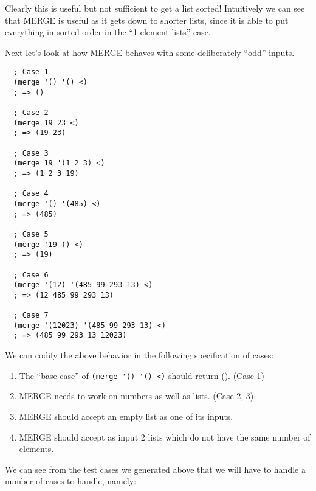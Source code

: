 \documentclass[12pt,openright,draft]{book}
\begin{document}
Clearly this is useful but not sufficient to get a list sorted!
Intuitively we can see that MERGE is useful as it gets down to shorter
lists, since it is able to put everything in sorted order in the
``1-element lists'' case.

Next let's look at how MERGE behaves with some deliberately ``odd''
inputs.

\begin{verbatim}
  ; Case 1
  (merge '() '() <)
  ; => ()

  ; Case 2
  (merge 19 23 <)
  ; => (19 23)

  ; Case 3
  (merge 19 '(1 2 3) <)
  ; => (1 2 3 19)

  ; Case 4
  (merge '() '(485) <)
  ; => (485)

  ; Case 5
  (merge '19 () <)
  ; => (19)

  ; Case 6
  (merge '(12) '(485 99 293 13) <)
  ; => (12 485 99 293 13)

  ; Case 7
  (merge '(12023) '(485 99 293 13) <)
  ; => (485 99 293 13 12023)
\end{verbatim}

We can codify the above behavior in the following specification of
cases:

\begin{enumerate}
\item The ``base case'' of \verb|(merge '() '() <)| should return ().
  (Case 1)

\item MERGE needs to work on numbers as well as lists. (Case 2, 3)

\item MERGE should accept an empty list as one of its inputs.

\item MERGE should accept as input 2 lists which do not have the same
  number of elements.
\end{enumerate}



We can see from the test cases we generated above that we will have to
handle a number of cases to handle, namely:
\end{document}
